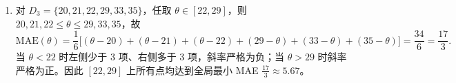 \begin{exercise}[title={常数模型在 MSE 与 MAE 下的异常值对比},level=basic,points=12,tags={常数模型,MSE,MAE,鲁棒性}]
\begin{solution}
\begin{enumerate}
  对含离群点的 $D_2 = \{20, 21, 22, 29, 200\}$：
  \[\begin{aligned}
    \hat{\theta}_{\mathrm{MSE}} &= \frac{292}{5} = 58.4, &
    \mathrm{MSE}(58.4) &= \frac{38.4^2+37.4^2+36.4^2+29.4^2+141.6^2}{5} = 5023.44,\\
    \hat{\theta}_{\mathrm{MAE}} &= \mathrm{median}(D_2) = 22, &
    \mathrm{MAE}(22) &= \frac{2+1+0+7+178}{5} = 37.6.
  \end{aligned}\]
  可见单个极端值将 MSE 估计从 $25$ 剧烈拉偏至 $58.4$，而 MAE 估计纹丝不动，充分体现了 $L_1$ 损失的抗噪性。
  \item 对 $D_3 = \{20, 21, 22, 29, 33, 35\}$，任取 $\theta \in [22, 29]$，则 $20,21,22 \le \theta \le 29,33,35$，故
  \[
    \mathrm{MAE}(\theta) = \frac{1}{6}\bigl[(\theta-20)+(\theta-21)+(\theta-22)+(29-\theta)+(33-\theta)+(35-\theta)\bigr] = \frac{34}{6} = \frac{17}{3}.
  \]
  当 $\theta < 22$ 时左侧少于 $3$ 项、右侧多于 $3$ 项，斜率严格为负；当 $\theta > 29$ 时斜率严格为正。因此 $[22, 29]$ 上所有点均达到全局最小 MAE $\frac{17}{3}\approx 5.67$。
\end{enumerate}
\end{solution}
\end{exercise}

